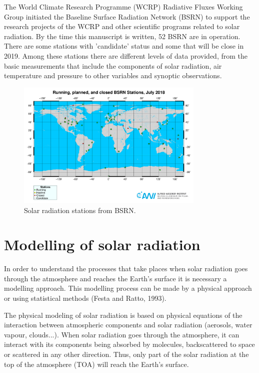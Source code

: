 The World Climate Research Programme (WCRP) Radiative Fluxes Working Group initiated the Baseline Surface Radiation Network (BSRN) to support the research projects of the WCRP and other scientific programs related to solar radiation. By the time this manuscript is written, 52 BSRN are in operation. There are some stations with 'candidate' status and some that will be close in 2019. Among these stations there are different levels of data provided, from the basic measurements that include the components of solar radiation, air temperature and pressure to other variables and synoptic observations.

\begin{figure}[h]
  \centering
  \includegraphics[width=0.8\textwidth]{DataMethodsFIGS/bsrn.pdf}
  \caption{Solar radiation stations from BSRN.}
 \label{fig:bsrnstations}
\end{figure}

\section{Modelling of solar radiation}

In order to understand the processes that take places when solar radiation goes through the atmosphere and reaches the Earth's surface it is necessary a modelling approach. This modelling process can be made by a physical approach or using statistical methods (Festa and Ratto, 1993).

The physical modeling of solar radiation is based on physical equations of the interaction between atmospheric components and solar radiation (aerosols, water vapour, clouds...). When solar radiation goes through the atmosphere, it can interact with its components being absorbed by molecules, backscattered to space or scattered in any other direction. Thus, only part of the solar radiation at the top of the atmosphere (TOA) will reach the Earth's surface.

